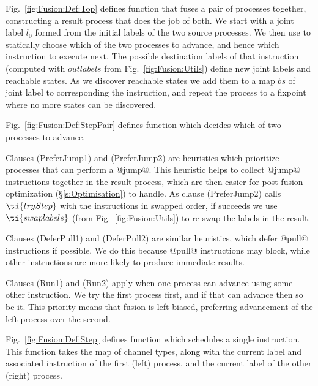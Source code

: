 



\smallskip
Fig.~\ref{fig:Fusion:Def:Top} defines function  that fuses a pair of processes together, constructing a result process that does the job of both. We start with a joint label $l_0$ formed from the initial labels of the two source processes. We then use  to statically choose which of the two processes to advance, and hence which instruction to execute next. The possible destination labels of that instruction (computed with $outlabels$ from Fig.~\ref{fig:Fusion:Utils}) define new joint labels and reachable states. As we discover reachable states we add them to a map $bs$ of joint label to corresponding the instruction, and repeat the process to a fixpoint where no more states can be discovered.



Fig.~\ref{fig:Fusion:Def:StepPair} defines function  which decides which of two processes to advance.

Clauses (PreferJump1) and (PreferJump2) are heuristics which prioritize processes that can perform a @jump@. This heuristic helps to collect @jump@ instructions together in the result process, which are then easier for post-fusion optimization (\S\ref{s:Optimisation}) to handle. As clause (PreferJump2) calls $\ti{tryStep}$ with the instructions in swapped order, if  succeeds we use $\ti{swaplabels}$ (from Fig.~\ref{fig:Fusion:Utils}) to re-swap the labels in the result.

Clauses (DeferPull1) and (DeferPull2) are similar heuristics, which defer @pull@ instructions if possible. We do this because @pull@ instructions may block, while other instructions are more likely to produce immediate results.

Clauses (Run1) and (Run2) apply when one process can advance using some other instruction. We try the first process first, and if that can advance then so be it. This priority means that fusion is left-biased, preferring advancement of the left process over the second.




\smallskip
Fig.~\ref{fig:Fusion:Def:Step} defines function  which schedules a single instruction. This function takes the map of channel types, along with the current label and associated instruction of the first (left) process, and the current label of the other (right) process.

